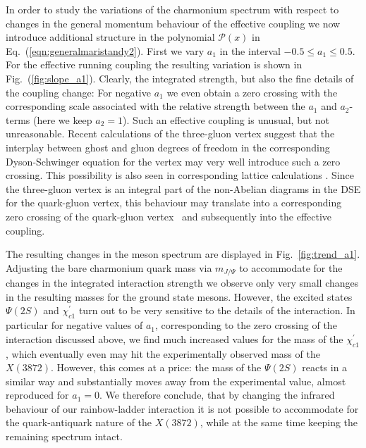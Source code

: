 In order to study the variations of the charmonium spectrum with respect to changes in the
general momentum behaviour of the effective coupling we now introduce
additional structure in the polynomial $\mathcal{P}(x)$ in Eq.~(\ref{eqn:generalmaristandy2}). 
First we vary $a_1$ in the interval
$-0.5 \le a_1 \le 0.5$. For the effective running coupling the resulting variation
is shown in Fig.~(\ref{fig:slope_a1}). Clearly, the integrated strength, but
also the fine details of the coupling change: For negative $a_1$ we even obtain 
a zero crossing with the corresponding scale associated with the relative
strength between the $a_1$ and $a_2$-terms (here we keep $a_2=1$). Such an 
effective coupling is unusual, but not unreasonable. Recent calculations of 
the three-gluon vertex \cite{Aguilar:2013vaa,Blum:2014gna,Eichmann:2014xya} suggest that the interplay between 
ghost and gluon degrees of freedom in the corresponding Dyson-Schwinger equation 
for the vertex may very well introduce such a zero crossing. This possibility is also 
seen in corresponding lattice calculations \cite{Cucchieri:2008qm}. Since the three-gluon 
vertex is an integral part of the non-Abelian diagrams in the DSE for the quark-gluon vertex, 
this behaviour may translate into a corresponding zero crossing of the quark-gluon 
vertex~\cite{Williams:2014iea} and subsequently into the effective coupling.

The resulting changes in the meson spectrum are displayed in 
Fig.~\ref{fig:trend_a1}. Adjusting the bare charmonium quark mass via $m_{J/\Psi}$
to accommodate for the changes in the integrated interaction strength we
observe only very small changes in the resulting masses for the ground state mesons.
However, the excited states $\Psi(2S)$ and $\chi_{c1}^{\prime}$ turn out to be very sensitive 
to the details of the interaction. In particular for negative values of $a_1$,
corresponding to the zero crossing of the interaction discussed above, we find much
increased values for the mass of the $\chi_{c1}^{\prime}$, which eventually even may 
hit the experimentally observed mass of the $X(3872)$. However, this comes at a price: 
the mass of the $\Psi(2S)$ reacts in a similar way and substantially moves away from 
the experimental value, almost reproduced for $a_1=0$. We therefore conclude, that 
by changing the infrared behaviour of our rainbow-ladder interaction it is not possible 
to accommodate for the quark-antiquark nature of the $X(3872)$, while at the same time 
keeping the remaining spectrum intact.


%
%
%
%
%

